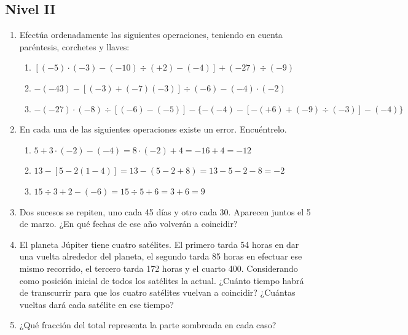 \documentclass[twoside]{article}
\begin{document}
\subsection*{Nivel II}
\begin{enumerate}
\item Efectúa ordenadamente las siguientes operaciones, teniendo en cuenta paréntesis, corchetes y llaves:
\begin{enumerate}
\item $[(-5)\cdot (-3)-(-10)\div (+2)-(-4)]+(-27)\div (-9)$
\item $-(-43)-[(-3)+(-7)(-3)]\div (-6)-(-4)\cdot (-2)$
\item $-(-27)\cdot (-8)\div [(-6)-(-5)]-\{-(-4)-[-(+6)+(-9)\div (-3)]-(-4)\}$
\end{enumerate}
\item En cada una de las siguientes operaciones existe un error. Encuéntrelo.
\begin{enumerate}
\item $5+3\cdot (-2)-(-4)=8\cdot (-2)+4=-16+4=-12$
\item $13-[5-2(1-4)]=13-(5-2+8)=13-5-2-8=-2$
\item $15\div 3+2-(-6)=15\div 5+6=3+6=9$
\end{enumerate}
\item Dos sucesos se repiten, uno cada 45 días y otro cada 30. Aparecen juntos el 5 de marzo. ¿En qué fechas de ese año volverán a coincidir?
\item El planeta Júpiter tiene cuatro satélites. El primero tarda 54 horas en dar una vuelta alrededor del planeta, el segundo tarda 85 horas en efectuar ese mismo recorrido, el tercero tarda 172 horas y el cuarto 400. Considerando como posición inicial de todos
los satélites la actual. ¿Cuánto tiempo habrá de transcurrir para que los cuatro satélites vuelvan a coincidir? ¿Cuántas vueltas dará cada satélite en ese tiempo?
\item ¿Qué fracción del total representa la parte sombreada en cada caso?
\begin{enumerate}
\end{enumerate}
\end{enumerate}
\end{document}
